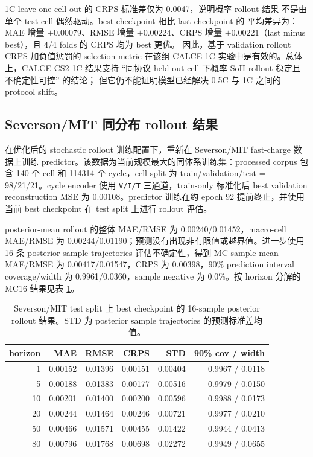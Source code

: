 \documentclass[11pt,a4paper,fontset=none]{ctexart}
\begin{document}
1C leave-one-cell-out 的 CRPS 标准差仅为 0.0047，说明概率 rollout 结果
不是由单个 test cell 偶然驱动。best checkpoint 相比 last checkpoint 的
平均差异为：MAE 增量 $+0.00079$、RMSE 增量 $+0.00224$、CRPS 增量
$+0.00221$（last minus best），且 4/4 folds 的 CRPS 均为 best 更优。
因此，基于 validation rollout CRPS 加负值惩罚的 selection metric 在该组
CALCE 1C 实验中是有效的。总体上，CALCE-CS2 1C 结果支持
``同协议 held-out cell 下概率 SoH rollout 稳定且不确定性可控'' 的结论；
但它仍不能证明模型已经解决 0.5C 与 1C 之间的 protocol shift。

\subsection{Severson/MIT 同分布 rollout 结果}

在优化后的 stochastic rollout 训练配置下，重新在 Severson/MIT fast-charge
数据上训练 predictor。该数据为当前规模最大的同体系训练集：processed corpus
包含 140 个 cell 和 114314 个 cycle，cell split 为 train/validation/test =
98/21/21。cycle encoder 使用 \texttt{V/I/T} 三通道，train-only 标准化后
best validation reconstruction MSE 为 0.00108。predictor 训练在约 epoch 92
提前终止，并使用当前 best checkpoint 在 test split 上进行 rollout 评估。

posterior-mean rollout 的整体 MAE/RMSE 为 0.00240/0.01452，macro-cell
MAE/RMSE 为 0.00244/0.01190；预测没有出现非有限值或越界值。进一步使用
16 条 posterior sample trajectories 评估不确定性，得到 MC sample-mean
MAE/RMSE 为 0.00417/0.01547，CRPS 为 0.00398，90\% prediction interval
coverage/width 为 0.9961/0.0360，sample negative 为 0.0\%。按 horizon
分解的 MC16 结果见表 \ref{tab:severson_mc16_horizon}。

\begin{table}[h]
\centering
\small
\begin{tabular}{rrrrrr}
\toprule
horizon & MAE & RMSE & CRPS & STD & 90\% cov / width \\
\midrule
1  & 0.00152 & 0.01396 & 0.00151 & 0.00404 & 0.9967 / 0.0118 \\
5  & 0.00188 & 0.01383 & 0.00177 & 0.00516 & 0.9979 / 0.0150 \\
10 & 0.00201 & 0.01400 & 0.00200 & 0.00596 & 0.9988 / 0.0173 \\
20 & 0.00244 & 0.01464 & 0.00246 & 0.00721 & 0.9977 / 0.0210 \\
50 & 0.00466 & 0.01571 & 0.00455 & 0.01422 & 0.9944 / 0.0413 \\
80 & 0.00796 & 0.01768 & 0.00698 & 0.02272 & 0.9949 / 0.0655 \\
\bottomrule
\end{tabular}
\caption{Severson/MIT test split 上 best checkpoint 的 16-sample posterior
rollout 结果。STD 为 posterior sample trajectories 的预测标准差均值。}
\label{tab:severson_mc16_horizon}
\end{table}
\end{document}
